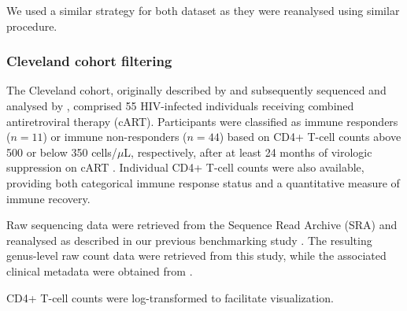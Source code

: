 \begin{bibunit}[apalike]
\begin{appendices}
We used a similar strategy for both dataset as they were reanalysed using similar procedure. 

\subsubsection*{Cleveland cohort filtering} \label{secA3}

The Cleveland cohort, originally described by \citet{lederman_immunologic_2011} and subsequently sequenced and analysed by \citet{nganou-makamdop_translocated_2021}, comprised 55 HIV-infected individuals receiving combined antiretroviral therapy (cART). Participants were classified as immune responders ($n=11$) or immune non-responders ($n=44$) based on CD4+ T-cell counts above 500 or below 350 cells/$\mu$L, respectively, after at least 24 months of virologic suppression on cART \citep{lederman_immunologic_2011}. Individual CD4+ T-cell counts were also available, providing both categorical immune response status and a quantitative measure of immune recovery.

Raw sequencing data were retrieved from the Sequence Read Archive (SRA) and reanalysed as described in our previous benchmarking study \citep{colajanni_benchmarking_2026}. The resulting genus-level raw count data were retrieved from this study, while the associated clinical metadata were obtained from \citet{nganou-makamdop_translocated_2021}.

CD4+ T-cell counts were log-transformed to facilitate visualization.


\end{appendices}
\end{bibunit}

